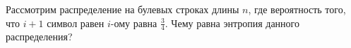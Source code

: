 Рассмотрим распределение на булевых строках длины $n$, где вероятность того, что $i + 1$ символ равен
$i$-ому равна $\frac{3}{4}$. Чему равна энтропия данного распределения?